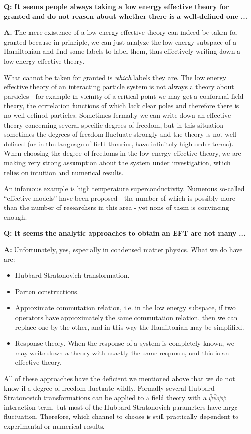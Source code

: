 \documentclass[hyperref, a4paper]{article}
\newenvironment{qanda}{\setlength{\parindent}{0pt}}{\bigskip}
\newcommand{\Q}{\bigskip\bfseries Q: }
\newcommand{\A}{\par\textbf{A:} \normalfont}
\begin{document}
\begin{qanda}

\Q It seems people always taking a low energy effective theory for granted and do not reason about whether there is a well-defined one ...
\A The mere existence of a low energy effective theory can indeed be taken for granted because in principle, we can just analyze the low-energy subspace of a Hamiltonian and find some labels to label them, thus effectively writing down a low energy effective theory.

What cannot be taken for granted is \emph{which} labels they are. The low energy effective theory of an interacting particle system is not always a theory about particles - for example in vicinity of a critical point we may get a conformal field theory, the correlation functions of which lack clear poles and therefore there is no well-defined particles.
Sometimes formally we can write down an effective theory concerning several specific degrees of freedom, but in this situation sometimes the degrees of freedom fluctuate strongly and the theory is not well-defined (or in the language of field theories, have infinitely high order terms). 
When choosing the degree of freedoms in the low energy effective theory, we are making very strong assumption about the system under investigation, which relies on intuition and numerical results.

An infamous example is high temperature superconductivity. Numerous so-called ``effective models'' have been proposed - the number of which is possibly more than the number of researchers in this area - yet none of them is convincing enough.

\Q It seems the analytic approaches to obtain an EFT are not many ...
\A Unfortunately, yes, especially in condensed matter physics. What we do have are:
\begin{itemize}
    \item Hubbard-Stratonovich transformation. 
    \item Parton constructions.
    \item Approximate commutation relation, i.e. in the low energy subspace, if two operators have approximately 
    the same commutation relation, then we can replace one by the other, and in this way the Hamiltonian may be 
    simplified.
    \item Response theory. When the response of a system is completely known, we may write down a theory with 
    exactly the same response, and this is an effective theory.
\end{itemize}
All of these approaches have the deficient we mentioned above that we do not know if a degree of freedom fluctuate wildly.
Formally several Hubbard-Stratonovich transformations can be applied to a field theory with a $\bar{\psi} \bar{\psi} \psi \psi$ interaction term, but most of the Hubbard-Stratonovich parameters have large fluctuation.
Therefore, which channel to choose is still practically dependent to experimental or numerical results.


\end{qanda}
\end{document}
